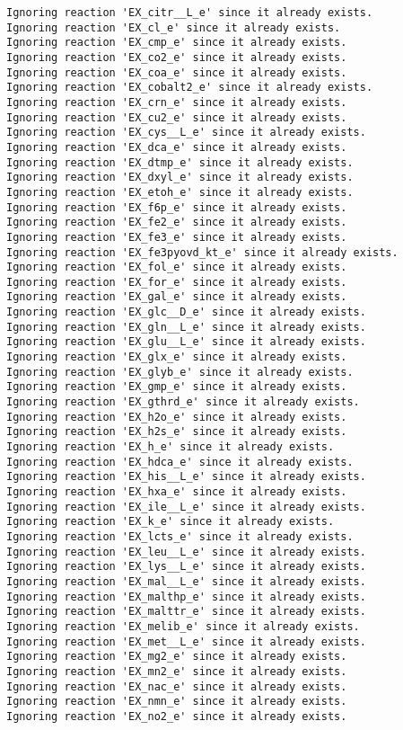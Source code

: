 \documentclass[
  letterpaper,
  DIV=11,
  numbers=noendperiod]{scrartcl}
\begin{document}
\begin{verbatim}
Ignoring reaction 'EX_citr__L_e' since it already exists.
Ignoring reaction 'EX_cl_e' since it already exists.
Ignoring reaction 'EX_cmp_e' since it already exists.
Ignoring reaction 'EX_co2_e' since it already exists.
Ignoring reaction 'EX_coa_e' since it already exists.
Ignoring reaction 'EX_cobalt2_e' since it already exists.
Ignoring reaction 'EX_crn_e' since it already exists.
Ignoring reaction 'EX_cu2_e' since it already exists.
Ignoring reaction 'EX_cys__L_e' since it already exists.
Ignoring reaction 'EX_dca_e' since it already exists.
Ignoring reaction 'EX_dtmp_e' since it already exists.
Ignoring reaction 'EX_dxyl_e' since it already exists.
Ignoring reaction 'EX_etoh_e' since it already exists.
Ignoring reaction 'EX_f6p_e' since it already exists.
Ignoring reaction 'EX_fe2_e' since it already exists.
Ignoring reaction 'EX_fe3_e' since it already exists.
Ignoring reaction 'EX_fe3pyovd_kt_e' since it already exists.
Ignoring reaction 'EX_fol_e' since it already exists.
Ignoring reaction 'EX_for_e' since it already exists.
Ignoring reaction 'EX_gal_e' since it already exists.
Ignoring reaction 'EX_glc__D_e' since it already exists.
Ignoring reaction 'EX_gln__L_e' since it already exists.
Ignoring reaction 'EX_glu__L_e' since it already exists.
Ignoring reaction 'EX_glx_e' since it already exists.
Ignoring reaction 'EX_glyb_e' since it already exists.
Ignoring reaction 'EX_gmp_e' since it already exists.
Ignoring reaction 'EX_gthrd_e' since it already exists.
Ignoring reaction 'EX_h2o_e' since it already exists.
Ignoring reaction 'EX_h2s_e' since it already exists.
Ignoring reaction 'EX_h_e' since it already exists.
Ignoring reaction 'EX_hdca_e' since it already exists.
Ignoring reaction 'EX_his__L_e' since it already exists.
Ignoring reaction 'EX_hxa_e' since it already exists.
Ignoring reaction 'EX_ile__L_e' since it already exists.
Ignoring reaction 'EX_k_e' since it already exists.
Ignoring reaction 'EX_lcts_e' since it already exists.
Ignoring reaction 'EX_leu__L_e' since it already exists.
Ignoring reaction 'EX_lys__L_e' since it already exists.
Ignoring reaction 'EX_mal__L_e' since it already exists.
Ignoring reaction 'EX_malthp_e' since it already exists.
Ignoring reaction 'EX_malttr_e' since it already exists.
Ignoring reaction 'EX_melib_e' since it already exists.
Ignoring reaction 'EX_met__L_e' since it already exists.
Ignoring reaction 'EX_mg2_e' since it already exists.
Ignoring reaction 'EX_mn2_e' since it already exists.
Ignoring reaction 'EX_nac_e' since it already exists.
Ignoring reaction 'EX_nmn_e' since it already exists.
Ignoring reaction 'EX_no2_e' since it already exists.

\end{verbatim}
\end{document}
